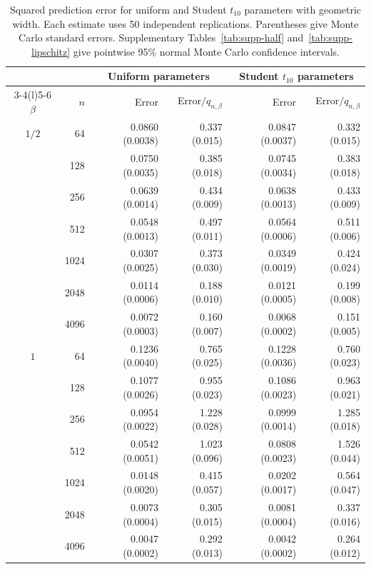 \documentclass[11pt,a4paper]{article}
\theoremstyle{remark}
\begin{document}
\begin{table}[htbp]
\caption{Squared prediction error for uniform and Student $t_{10}$ parameters with geometric width. Each estimate uses 50 independent replications. Parentheses give Monte Carlo standard errors. Supplementary Tables~\ref{tab:supp-half} and~\ref{tab:supp-lipschitz} give pointwise 95\% normal Monte Carlo confidence intervals.}
\label{tab:direct-family-adaptive-risk}
\centering\small
\begin{tabular}{@{}crrrrr@{}}
\toprule
& & \multicolumn{2}{c}{Uniform parameters} & \multicolumn{2}{c}{Student $t_{10}$ parameters}\\
\cmidrule(lr){3-4}\cmidrule(l){5-6}
$\beta$ & $n$ & Error & Error$/q_{n,\beta}$ & Error & Error$/q_{n,\beta}$\\
\midrule
$1/2$ & 64 & 0.0860 (0.0038) & 0.337 (0.015) & 0.0847 (0.0037) & 0.332 (0.015)\\
 & 128 & 0.0750 (0.0035) & 0.385 (0.018) & 0.0745 (0.0034) & 0.383 (0.018)\\
 & 256 & 0.0639 (0.0014) & 0.434 (0.009) & 0.0638 (0.0013) & 0.433 (0.009)\\
 & 512 & 0.0548 (0.0013) & 0.497 (0.011) & 0.0564 (0.0006) & 0.511 (0.006)\\
 & 1024 & 0.0307 (0.0025) & 0.373 (0.030) & 0.0349 (0.0019) & 0.424 (0.024)\\
 & 2048 & 0.0114 (0.0006) & 0.188 (0.010) & 0.0121 (0.0005) & 0.199 (0.008)\\
 & 4096 & 0.0072 (0.0003) & 0.160 (0.007) & 0.0068 (0.0002) & 0.151 (0.005)\\
\midrule
$1$ & 64 & 0.1236 (0.0040) & 0.765 (0.025) & 0.1228 (0.0036) & 0.760 (0.023)\\
 & 128 & 0.1077 (0.0026) & 0.955 (0.023) & 0.1086 (0.0023) & 0.963 (0.021)\\
 & 256 & 0.0954 (0.0022) & 1.228 (0.028) & 0.0999 (0.0014) & 1.285 (0.018)\\
 & 512 & 0.0542 (0.0051) & 1.023 (0.096) & 0.0808 (0.0023) & 1.526 (0.044)\\
 & 1024 & 0.0148 (0.0020) & 0.415 (0.057) & 0.0202 (0.0017) & 0.564 (0.047)\\
 & 2048 & 0.0073 (0.0004) & 0.305 (0.015) & 0.0081 (0.0004) & 0.337 (0.016)\\
 & 4096 & 0.0047 (0.0002) & 0.292 (0.013) & 0.0042 (0.0002) & 0.264 (0.012)\\
\bottomrule
\end{tabular}
\end{table}
\end{document}
